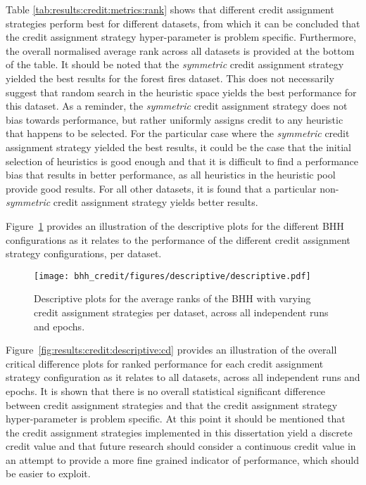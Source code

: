 Table \ref{tab:results:credit:metrics:rank} shows that different credit assignment strategies perform best for different datasets, from which it can be concluded that the credit assignment strategy hyper-parameter is problem specific. Furthermore, the overall normalised average rank across all datasets is provided at the bottom of the table. It should be noted that the \textit{symmetric} credit assignment strategy yielded the best results for the forest fires dataset. This does not necessarily suggest that random search in the heuristic space yields the best performance for this dataset. As a reminder, the \textit{symmetric} credit assignment strategy does not bias towards performance, but rather uniformly assigns credit to any heuristic that happens to be selected. For the particular case where the \textit{symmetric} credit assignment strategy yielded the best results, it could be the case that the initial selection of heuristics is good enough and that it is difficult to find a performance bias that results in better performance, as all heuristics in the heuristic pool provide good results. For all other datasets, it is found that a particular non-\textit{symmetric} credit assignment strategy yields better results.

Figure~\ref{fig:results:credit:descriptive:descriptive} provides an illustration of the descriptive plots for the different \acs{BHH} configurations as it relates to the performance of the different credit assignment strategy configurations, per dataset.

\begin{figure}[htb]
      \centering
      \texttt{[image: bhh\_credit/figures/descriptive/descriptive.pdf]}
      \caption{Descriptive plots for the average ranks of the \acs{BHH} with varying credit assignment strategies per dataset, across all independent runs and epochs.}
      \label{fig:results:credit:descriptive:descriptive}
\end{figure}

Figure~\ref{fig:results:credit:descriptive:cd} provides an illustration of the overall critical difference plots for ranked performance for each credit assignment strategy configuration as it relates to all datasets, across all independent runs and epochs. It is shown that there is no overall statistical significant difference between credit assignment strategies and that the credit assignment strategy hyper-parameter is problem specific. At this point it should be mentioned that the credit assignment strategies implemented in this dissertation yield a discrete credit value and that future research should consider a continuous credit value in an attempt to provide a more fine grained indicator of performance, which should be easier to exploit.


